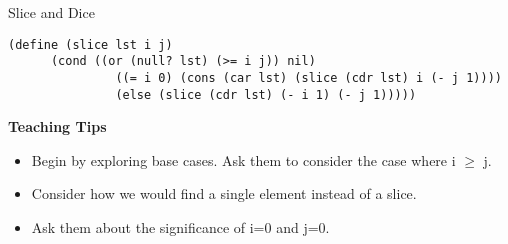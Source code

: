 \question Slice and Dice

\begin{parts}
\begin{blocksection}

\begin{solution}
\begin{lstlisting}
(define (slice lst i j)
      (cond ((or (null? lst) (>= i j)) nil)
               ((= i 0) (cons (car lst) (slice (cdr lst) i (- j 1))))
               (else (slice (cdr lst) (- i 1) (- j 1)))))
\end{lstlisting}
\end{solution}

\end{blocksection}

\begin{blocksection}
\begin{guide}
\textbf{Teaching Tips}
\begin{itemize}
	\item Begin by exploring base cases. Ask them to consider the case where i $\geq$ j.
	\item Consider how we would find a single element instead of a slice.
	\item Ask them about the significance of i=0 and j=0.
\end{itemize}
\end{guide}
\end{blocksection}



\end{parts}
